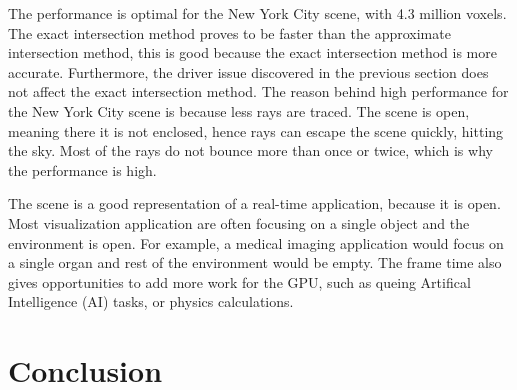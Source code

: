 \documentclass[12pt]{article}
\begin{document}
The performance is optimal for the New York City scene, with 4.3 million voxels.
The exact intersection method proves to be faster than the approximate intersection method,
this is good because the exact intersection method is more accurate. Furthermore, the driver
issue discovered in the previous section does not affect the exact intersection method.
The reason behind high performance for the New York City scene is because less rays are traced.
The scene is open, meaning there it is not enclosed, hence rays can escape the scene quickly,
hitting the sky. Most of the rays do not bounce more than once or twice, which is why the performance is high.

The scene is a good representation of a real-time application, because it is open.
Most visualization application are often focusing on a single object and the environment is open.
For example, a medical imaging application would focus on a single organ and rest of the environment would be empty.
The frame time also gives opportunities to add more work for the GPU, such as queing Artifical Intelligence (AI) tasks,
or physics calculations.

\section{Conclusion}



\printbibliography
\end{document}
